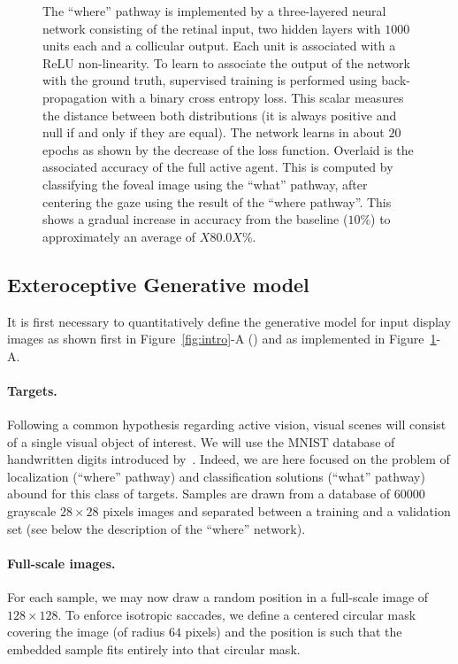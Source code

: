 \begin{figure}[t!]
{\C The ``where'' pathway is implemented by a three-layered neural network consisting of the retinal input, two hidden layers with $1000$ units each and a collicular output. Each unit is associated with a ReLU non-linearity. To learn to associate the output of the network with the ground truth, supervised training is performed using back-propagation with a binary cross entropy loss. This scalar measures the distance between both distributions (it is always positive and null if and only if they are equal). The network learns in about $20$ epochs as shown by the decrease of the loss function. Overlaid is the associated accuracy of the full active agent. This is computed by classifying the foveal image using the ``what'' pathway, after centering the gaze using the result of the ``where pathway''. This shows a gradual increase in accuracy from the baseline ($10\%$) to approximately an average of $X80.0X\%$. %
		\label{fig:methods}}%
\end{figure}%
%
\subsection{Exteroceptive Generative model}
It is first necessary to quantitatively define the generative model for input display images as shown first in Figure~\ref{fig:intro}-A (\DIS ) and as implemented in Figure~\ref{fig:methods}-A.

\paragraph{Targets.} Following a common hypothesis regarding active vision, visual scenes will consist of a single visual object of interest. We will use the MNIST database of handwritten digits introduced by~\citep{Lecun1998}. Indeed, we are here focused on the problem of localization (``where'' pathway) and classification solutions (``what'' pathway) abound for this class of targets. Samples are drawn from a database of $60000$ grayscale $28\times 28$ pixels images and separated between a training and a validation set (see below the description of the ``where'' network).
\paragraph{Full-scale images.} For each sample, we may now draw a random position in a full-scale image of $128\times 128$. To enforce isotropic saccades, we define a centered circular mask covering the image (of radius $64$ pixels) and the position is such that the embedded sample fits entirely into that circular mask.
